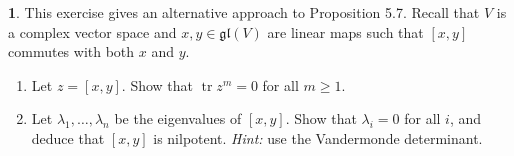 \documentclass[12pt]{article}
\DeclareMathOperator{\tr}{tr}
\newcommand{\gl}{\mathfrak{gl}}
\theoremstyle{definition}
\newtheorem{ex}{}
\begin{document}
\begin{ex}
  This exercise gives an alternative approach to Proposition 5.7.
  Recall that $V$ is a complex vector space and $x,y \in \gl(V)$ are linear maps such that $[x,y]$ commutes with both $x$ and $y$.
  \begin{enumerate}[label=(\roman*)]
    \item Let $z = [x,y]$.
      Show that $\tr z^m = 0$ for all $m \geq 1$.
    \item Let $\lambda_1, \dots, \lambda_n$ be the eigenvalues of $[x, y]$.
      Show that $\lambda_i=0$ for all $i$, and deduce that $[x,y]$ is nilpotent.
      \textit{Hint:} use the Vandermonde determinant.
  \end{enumerate}
\end{ex}
\end{document}
